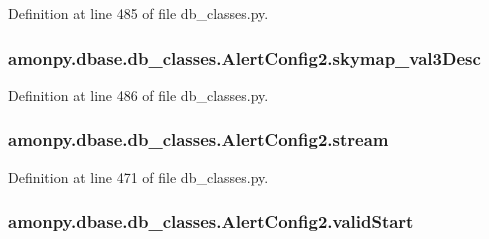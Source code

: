 Definition at line 485 of file db\-\_\-classes.\-py.

\hypertarget{classamonpy_1_1dbase_1_1db__classes_1_1_alert_config2_a6c28894bd6690a2b0faeb36be8eb351f}{
\subsubsection[{skymap\-\_\-val3\-Desc}]{\setlength{\rightskip}{0pt plus 5cm}amonpy.\-dbase.\-db\-\_\-classes.\-Alert\-Config2.\-skymap\-\_\-val3\-Desc}}\label{classamonpy_1_1dbase_1_1db__classes_1_1_alert_config2_a6c28894bd6690a2b0faeb36be8eb351f}


Definition at line 486 of file db\-\_\-classes.\-py.

\hypertarget{classamonpy_1_1dbase_1_1db__classes_1_1_alert_config2_a49f8af0cfc12e4f73da64323780102e8}{
\subsubsection[{stream}]{\setlength{\rightskip}{0pt plus 5cm}amonpy.\-dbase.\-db\-\_\-classes.\-Alert\-Config2.\-stream}}\label{classamonpy_1_1dbase_1_1db__classes_1_1_alert_config2_a49f8af0cfc12e4f73da64323780102e8}


Definition at line 471 of file db\-\_\-classes.\-py.

\hypertarget{classamonpy_1_1dbase_1_1db__classes_1_1_alert_config2_ac8bd043fc32dc2de20f5ee1cf57762e7}{
\subsubsection[{valid\-Start}]{\setlength{\rightskip}{0pt plus 5cm}amonpy.\-dbase.\-db\-\_\-classes.\-Alert\-Config2.\-valid\-Start}}\label{classamonpy_1_1dbase_1_1db__classes_1_1_alert_config2_ac8bd043fc32dc2de20f5ee1cf57762e7}


